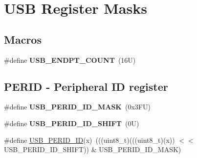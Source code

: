 \hypertarget{group___u_s_b___register___masks}{}\section{U\+SB Register Masks}
\label{group___u_s_b___register___masks}
\subsection*{Macros}
\begin{DoxyCompactItemize}
\item 
\mbox{\label{group___u_s_b___register___masks_gaf22fcbe1a661ff87db9323cb4651b357}} 
\#define {\bfseries U\+S\+B\+\_\+\+E\+N\+D\+P\+T\+\_\+\+C\+O\+U\+NT}~(16\+U)
\end{DoxyCompactItemize}
\subsection*{P\+E\+R\+ID -\/ Peripheral ID register}
\begin{DoxyCompactItemize}
\item 
\mbox{\label{group___u_s_b___register___masks_ga7c4ef4c7ba738b9ec7ee90c6c482c1e5}} 
\#define {\bfseries U\+S\+B\+\_\+\+P\+E\+R\+I\+D\+\_\+\+I\+D\+\_\+\+M\+A\+SK}~(0x3\+F\+U)
\item 
\mbox{\label{group___u_s_b___register___masks_ga15b2af97cadcb108b2489e2d29e8957e}} 
\#define {\bfseries U\+S\+B\+\_\+\+P\+E\+R\+I\+D\+\_\+\+I\+D\+\_\+\+S\+H\+I\+FT}~(0\+U)
\item 
\#define \mbox{\hyperlink{group___u_s_b___register___masks_gad306299b648ed1827f0b4a6ad1c81c1d}{U\+S\+B\+\_\+\+P\+E\+R\+I\+D\+\_\+\+ID}}(x)~(((uint8\+\_\+t)(((uint8\+\_\+t)(x)) $<$$<$ U\+S\+B\+\_\+\+P\+E\+R\+I\+D\+\_\+\+I\+D\+\_\+\+S\+H\+I\+FT)) \& U\+S\+B\+\_\+\+P\+E\+R\+I\+D\+\_\+\+I\+D\+\_\+\+M\+A\+SK)
\end{DoxyCompactItemize}
